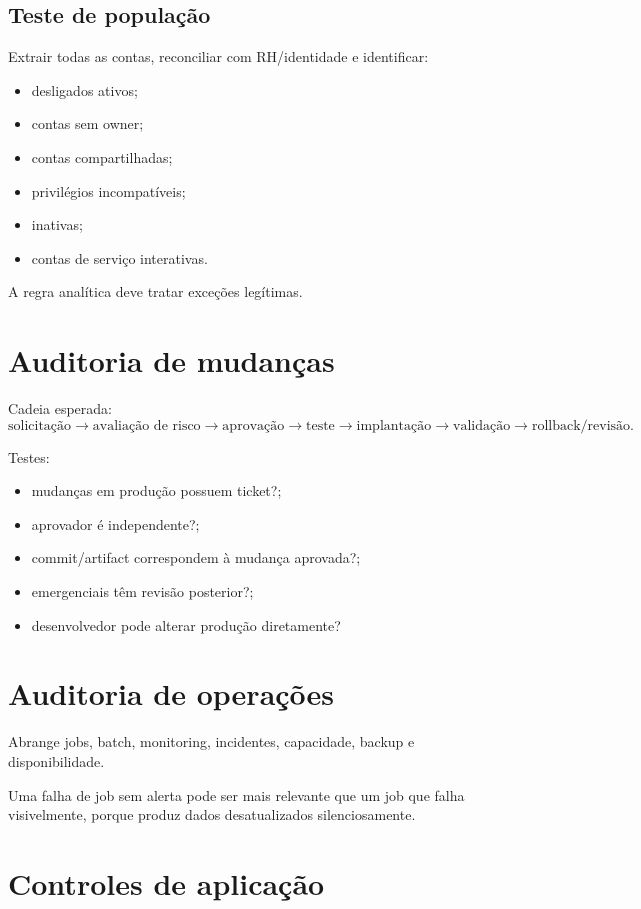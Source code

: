 \subsection{Teste de população}

Extrair todas as contas, reconciliar com RH/identidade e identificar:
\begin{itemize}
\item desligados ativos;
\item contas sem owner;
\item contas compartilhadas;
\item privilégios incompatíveis;
\item inativas;
\item contas de serviço interativas.
\end{itemize}

A regra analítica deve tratar exceções legítimas.

\section{Auditoria de mudanças}

Cadeia esperada:
\[
\text{solicitação}\rightarrow
\text{avaliação de risco}\rightarrow
\text{aprovação}\rightarrow
\text{teste}\rightarrow
\text{implantação}\rightarrow
\text{validação}\rightarrow
\text{rollback/revisão}.
\]

Testes:
\begin{itemize}
\item mudanças em produção possuem ticket?;
\item aprovador é independente?;
\item commit/artifact correspondem à mudança aprovada?;
\item emergenciais têm revisão posterior?;
\item desenvolvedor pode alterar produção diretamente?
\end{itemize}

\section{Auditoria de operações}

Abrange jobs, batch, monitoring, incidentes, capacidade, backup e disponibilidade.

Uma falha de job sem alerta pode ser mais relevante que um job que falha visivelmente, porque produz dados desatualizados silenciosamente.

\section{Controles de aplicação}

